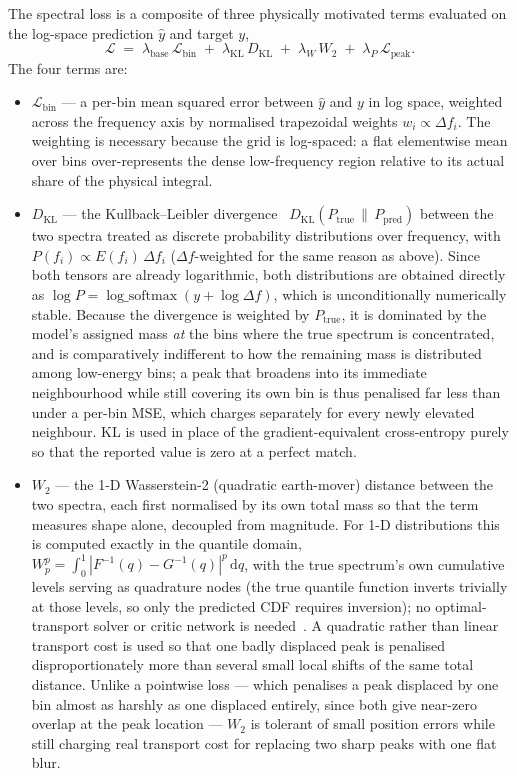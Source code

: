 The spectral loss is a composite of three physically motivated terms evaluated on the log-space prediction $\hat{y}$ and target $y$,
\begin{equation}
\mathcal{L} \;=\; \lambda_{\text{base}}\,\mathcal{L}_{\text{bin}}
\;+\; \lambda_{\text{KL}}\,D_{\text{KL}}
\;+\; \lambda_{W}\,W_2
\;+\; \lambda_{P}\,\mathcal{L}_{\text{peak}} .
\label{eq:loss}
\end{equation}
The four terms are:
\begin{itemize}
  \item $\mathcal{L}_{\text{bin}}$ — a per-bin mean squared error between $\hat{y}$ and $y$ in log space, weighted across the frequency axis by normalised trapezoidal weights $w_i \propto \Delta f_i$. The weighting is necessary because the grid is log-spaced: a flat elementwise mean over bins over-represents the dense low-frequency region relative to its actual share of the physical integral.
  \item $D_{\text{KL}}$ — the Kullback--Leibler divergence~\cite{kullback1951} $D_{\text{KL}}(P_{\text{true}}\,\|\,P_{\text{pred}})$ between the two spectra treated as discrete probability distributions over frequency, with $P(f_i) \propto E(f_i)\,\Delta f_i$ ($\Delta f$-weighted for the same reason as above). Since both tensors are already logarithmic, both distributions are obtained directly as $\log P = \operatorname{log\_softmax}(y + \log \Delta f)$, which is unconditionally numerically stable. Because the divergence is weighted by $P_{\text{true}}$, it is dominated by the model's assigned mass \emph{at} the bins where the true spectrum is concentrated, and is comparatively indifferent to how the remaining mass is distributed among low-energy bins; a peak that broadens into its immediate neighbourhood while still covering its own bin is thus penalised far less than under a per-bin MSE, which charges separately for every newly elevated neighbour. KL is used in place of the gradient-equivalent cross-entropy purely so that the reported value is zero at a perfect match.
  \item $W_2$ — the 1-D Wasserstein-2 (quadratic earth-mover) distance between the two spectra, each first normalised by its own total mass so that the term measures shape alone, decoupled from magnitude. For 1-D distributions this is computed exactly in the quantile domain, $W_p^p = \int_0^1 |F^{-1}(q) - G^{-1}(q)|^p\,\mathrm{d}q$, with the true spectrum's own cumulative levels serving as quadrature nodes (the true quantile function inverts trivially at those levels, so only the predicted CDF requires inversion); no optimal-transport solver or critic network is needed~\cite{peyre2019}. A quadratic rather than linear transport cost is used so that one badly displaced peak is penalised disproportionately more than several small local shifts of the same total distance. Unlike a pointwise loss — which penalises a peak displaced by one bin almost as harshly as one displaced entirely, since both give near-zero overlap at the peak location — $W_2$ is tolerant of small position errors while still charging real transport cost for replacing two sharp peaks with one flat blur.

\end{itemize}
